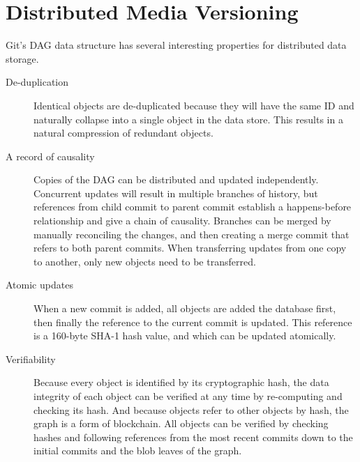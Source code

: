\section{Distributed Media Versioning}



Git's \gls{DAG} data structure has several interesting properties for distributed data storage.

\begin{description}

    \item[De-duplication]
        Identical objects are de-duplicated because they will have the same ID and naturally collapse into a single object in the data store.
        This results in a natural compression of redundant objects.

    \item[A record of causality]
        Copies of the DAG can be distributed and updated independently.
        Concurrent updates will result in multiple branches of history, but references from child commit to parent commit establish a happens-before relationship and give a chain of causality.
        Branches can be merged by manually reconciling the changes, and then creating a merge commit that refers to both parent commits.
        When transferring updates from one copy to another, only new objects need to be transferred.

    \item[Atomic updates]
        When a new commit is added, all objects are added the database first, then finally the reference to the current commit is updated.
        This reference is a 160-byte SHA-1 hash value, and which can be updated atomically.

    \item[Verifiability]
        Because every object is identified by its cryptographic hash, the data integrity of each object can be verified at any time by re-computing and checking its hash.
        And because objects refer to other objects by hash, the graph is a form of blockchain.
        All objects can be verified by checking hashes and following references from the most recent commits down to the initial commits and the blob leaves of the graph.

\end{description}

